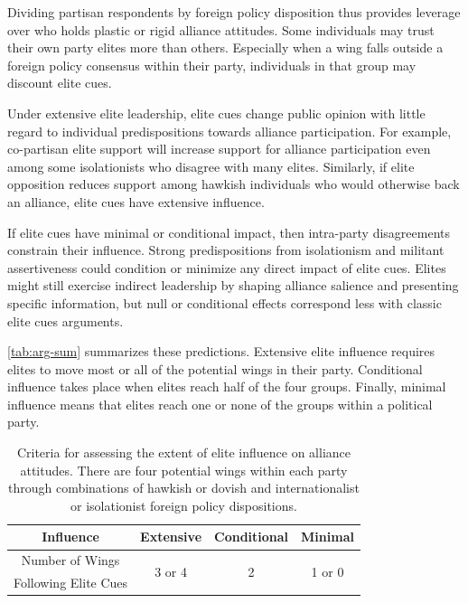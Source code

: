 \documentclass[12pt]{article}
\begin{document}
Dividing partisan respondents by foreign policy disposition thus provides leverage over who holds plastic or rigid alliance attitudes. 
Some individuals may trust their own party elites more than others. 
Especially when a wing falls outside a foreign policy consensus within their party, individuals in that group may discount elite cues.


Under extensive elite leadership, elite cues change public opinion with little regard to individual predispositions towards alliance participation. 
For example, co-partisan elite support will increase support for alliance participation even among some isolationists who disagree with many elites. 
Similarly, if elite opposition reduces support among hawkish individuals who would otherwise back an alliance, elite cues have extensive influence. 


If elite cues have minimal or conditional impact, then intra-party disagreements constrain their influence.
Strong predispositions from isolationism and militant assertiveness could condition or minimize any direct impact of elite cues.
Elites might still exercise indirect leadership by shaping alliance salience and presenting specific information, but null or conditional effects correspond less with classic elite cues arguments. 


\autoref{tab:arg-sum} summarizes these predictions. 
Extensive elite influence requires elites to move most or all of the potential wings in their party. 
Conditional influence takes place when elites reach half of the four groups. 
Finally, minimal influence means that elites reach one or none of the groups within a political party.


\begin{table}[hbt!]
\begin{center}
\begin{tabular}{| c | c | c | c |}
\hline
   Influence          & Extensive & Conditional & Minimal  \\
\hline
   Number of Wings   & \multirow{2}{*}{3 or 4}  & \multirow{2}{*}{2}  & \multirow{2}{*}{1 or 0} \\
   Following Elite Cues     &           &             &  \\
\hline
\end{tabular}
\caption{Criteria for assessing the extent of elite influence on alliance attitudes. There are four potential wings within each party through combinations of hawkish or dovish and internationalist or isolationist foreign policy dispositions.}
\label{tab:arg-sum}
\end{center} 
\end{table}
\end{document}
